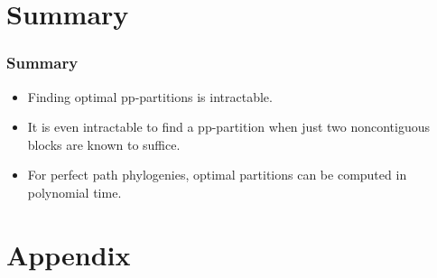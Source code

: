 \documentclass[aspectratio=1610]{beamer}
\begin{document}
\section*{Summary}

\begin{frame}
  \frametitle<presentation>{Summary}

  \begin{itemize}
  \item
    Finding optimal pp-partitions is \alert{intractable}. 
  \item
    It is even intractable to find a pp-partition when \alert{just two 
      noncontiguous  blocks are known to suffice}.
  \item
    For perfect \alert{path} phylogenies, optimal partitions can be
    computed \alert{in polynomial time}.
  \end{itemize}
\end{frame}


\appendix

\section*{Appendix}
\end{document}
